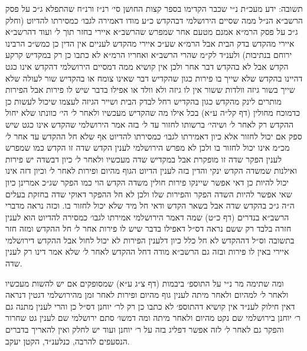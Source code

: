 \documentclass[12pt, openany]{book}
\begin{document}
\begin{multicols}{2}
תשובה: ידע מעכ״ת נ״י שכבר הקדימו בספר קצות החושן סי׳ רנ״ז ורנ״ח שהתפלא ג״כ על פסק הרשב״א הנ״ל ממה שסיים הירושלמי דבהקדש כ״ע מודו דאמירה לגבו׳ כמסירתו להדיוט (וחלק ג״כ על פסק הרמ״א אמנם מטעם אחר שמפרש שהרשב״א איירי בחזר תוך ל׳ ועוד דהרשב״א איירי מהקדש בדק הבית אבל הרמ״א שע״כ איירי מהקדש לעניים אין הדין כן כמש״כ הרבינו ירוחם בנתיבות) ולענ״ד לק״מ שהרי הרשב״א ואחריו הרמ״א לא כתבו כן רק במקדיש קרקע הקדש אבל לא בהקדש דבר אחר ולכן אין קושיא ממה דמסיים הירושלמי דהקדש אינו כגט דהיינו בהקדש שלא שייך בו פירות כגון שהקדיש דבר שאינו צומח או בהקדיש שור לעולה שלא שייך בשור גיזה וולדות ששור אין לו גיזה ולא וולד או אפילו בדבר שיש לו פירות אבל הפירות מותרים לינק מהקדש כגון בהקדיש רחל לבדק הבית ושייר הגיזה לעצמו שיכול לעשות כן כדמוכח מחולין (דף קל״ה ע״א) בכל אילו מה שהקדיש מעכשיו ולאחר ל׳ הי׳ כוונתו שלא יחול ההקדש רק לאחר ל׳ ושיהי׳ ברשותו לחזור עד ל׳ בזה אמר הירושלמי שהקדש אינו כגט שיש ספק אם יכול לחזור אלא כיון דאמירתו לגבו׳ כמסירתו להדיוט אף שלא חל ההקדש עד אחר ל׳ מכ״מ אינו יכול לחזור בו ולכן לא מפרש הירושלמי לענין הקדש שדה זו הקדש כמו שמפרש לענין הפקר שדה זו מופקרת אבל במקדיש שדה מעכשיו ולאחר ל׳ כיון דבשדה יש פירות ואילנות שמשדה הקדש ינקי והדין בזה לענין הדיוט הגוף מהיום ופירות לאחר ל׳ וכיון דזה אינו יכול להיות כן דאי אפשר שיינקו פירות חולין משדה הקדש הוי כמו הפקר שג״כ אמרינן כיון שאי אפשר להיות השדה הפקר והפירות שלו ולכן לא חל ההפקר דאוקי שדה בחזקת בעלים ה״ה ג״כ בהקדש שדה אבל בשאר הקדש ודאי חל מיד שלא יכול לחזור בו. וכזה נראה מדברי הרשב״א בנדרים (דף כ״ט) שמה דאמר הירושלמי אמירתו לגבו׳ כמסירה להדיוט הוא לענין חזרה בלבד רק ששם נראה דס״ל דאפילו בדבר שיש לו פירות אחר ל׳ חל ההקדש ומזה חזר בתשובה וס״ל דההקדש לא חל כלל כיון דלענין הפירות לא יכול לחול אבל ההקדש דירושלמי איירי באין לו פירות ובזה גם הרשב״א מודה דחל ההקדש לאחר ל׳ שלא אמר דינו רק לענין שדה.\\\vspace{0pt}

ומה שתימה מר נ״י על התוספ׳ ביבמות (דף צ״ג ע״א) שמסופקים אם יש להשות מעכשיו ולאחר ל׳ למהיום ולאחר מיתה לענין גוף מהיום ופירות לאחר זמן מהירושלמי דגטין דנראה דאין חילוק לענ״ד אין קושיא דהתוספ׳ לא כתבו כן רק לר׳ יוחנן דס״ל כן והרי לענין מתנה גם ר׳ יוחנן בירושלמי שם נקט מהיום ולאחר מיתה ומה דמשו׳ סתם ירושלמי שם לענין גט שחרור והפקר גם לאחר ל׳ לזה אפשר דפליג בזה על ר׳ יוחנן ועוד יש לחלק ואין להאריך בדברים הנסעפים להרבה, כנלענ״ד, הקטן יעקב.\\\vspace{0pt}

\end{multicols}\newpage
\end{document}
